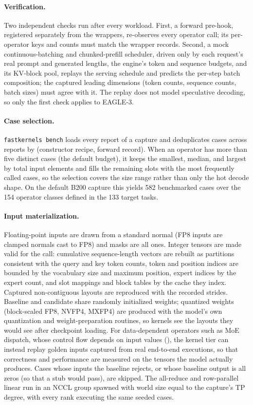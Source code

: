 \paragraph{Verification.}
Two independent checks run after every workload.
First, a forward pre-hook, registered separately from the wrappers, re-observes every operator call; its per-operator keys and counts must match the wrapper records.
Second, a mock continuous-batching and chunked-prefill scheduler, driven only by each request's real prompt and generated lengths, the engine's token and sequence budgets, and its KV-block pool, replays the serving schedule and predicts the per-step batch composition; the captured leading dimensions (token counts, sequence counts, batch sizes) must agree with it.
The replay does not model speculative decoding, so only the first check applies to EAGLE-3.

\paragraph{Case selection.}
\texttt{fastkernels bench} loads every report of a capture and deduplicates cases across reports by (constructor recipe, forward record).
When an operator has more than five distinct cases (the default budget), it keeps the smallest, median, and largest by total input elements and fills the remaining slots with the most frequently called cases, so the selection covers the size range rather than only the hot decode shape.
On the default B200 capture this yields 582 benchmarked cases over the 154 operator classes defined in the 133 target tasks.

\paragraph{Input materialization.}
Floating-point inputs are drawn from a standard normal (FP8 inputs are clamped normals cast to FP8) and masks are all ones.
Integer tensors are made valid for the call: cumulative sequence-length vectors are rebuilt as partitions consistent with the query and key token counts, token and position indices are bounded by the vocabulary size and maximum position, expert indices by the expert count, and slot mappings and block tables by the cache they index.
Captured non-contiguous layouts are reproduced with the recorded strides.
Baseline and candidate share randomly initialized weights; quantized weights (block-scaled FP8, NVFP4, MXFP4) are produced with the model's own quantization and weight-preparation routines, so kernels see the layouts they would see after checkpoint loading.
For data-dependent operators such as MoE dispatch, whose control flow depends on input values (), the kernel tier can instead replay golden inputs captured from real end-to-end executions, so that correctness and performance are measured on the tensors the model actually produces.
Cases whose inputs the baseline rejects, or whose baseline output is all zeros (so that a stub would pass), are skipped.
The all-reduce and row-parallel linear run in an NCCL group spawned with world size equal to the capture's TP degree, with every rank executing the same seeded cases.

